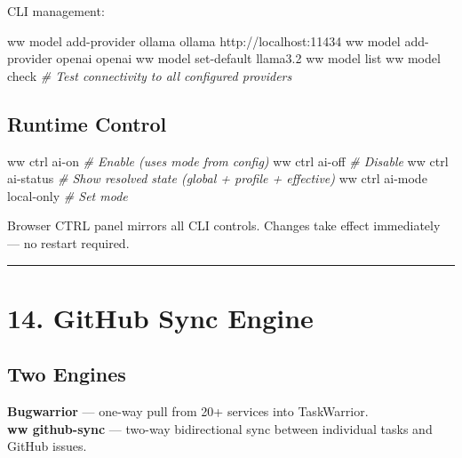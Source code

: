 \documentclass[
]{article}
\newenvironment{Shaded}{\begin{snugshade}}{\end{snugshade}}
\newcommand{\CommentTok}[1]{\textcolor[rgb]{0.56,0.35,0.01}{\textit{#1}}}
\newcommand{\ExtensionTok}[1]{#1}
\newcommand{\NormalTok}[1]{#1}
\begin{document}
CLI management:

\begin{Shaded}
\begin{Highlighting}[]
\ExtensionTok{ww}\NormalTok{ model add{-}provider ollama ollama http://localhost:11434}
\ExtensionTok{ww}\NormalTok{ model add{-}provider openai openai}
\ExtensionTok{ww}\NormalTok{ model set{-}default llama3.2}
\ExtensionTok{ww}\NormalTok{ model list}
\ExtensionTok{ww}\NormalTok{ model check          }\CommentTok{\# Test connectivity to all configured providers}
\end{Highlighting}
\end{Shaded}

\subsection{Runtime Control}\label{runtime-control}

\begin{Shaded}
\begin{Highlighting}[]
\ExtensionTok{ww}\NormalTok{ ctrl ai{-}on           }\CommentTok{\# Enable (uses mode from config)}
\ExtensionTok{ww}\NormalTok{ ctrl ai{-}off          }\CommentTok{\# Disable}
\ExtensionTok{ww}\NormalTok{ ctrl ai{-}status       }\CommentTok{\# Show resolved state (global + profile + effective)}
\ExtensionTok{ww}\NormalTok{ ctrl ai{-}mode local{-}only  }\CommentTok{\# Set mode}
\end{Highlighting}
\end{Shaded}

Browser CTRL panel mirrors all CLI controls. Changes take effect
immediately --- no restart required.

\begin{center}\rule{0.5\linewidth}{0.5pt}\end{center}

\section{14. GitHub Sync Engine}\label{github-sync-engine}

\subsection{Two Engines}\label{two-engines}

\textbf{Bugwarrior} --- one-way pull from 20+ services into
TaskWarrior.\\
\textbf{ww github-sync} --- two-way bidirectional sync between
individual tasks and GitHub issues.
\end{document}
